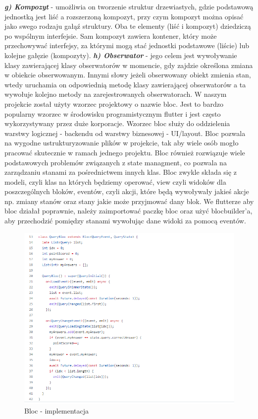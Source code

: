\newline\textbf{\textit{g) Kompozyt}} - umożliwia on tworzenie struktur drzewiastych, gdzie podstawową jednostką jest liść  a rozszerzoną kompozyt, przy czym kompozyt można opisać jako swego rodzaju gałąź struktury. Oba te elementy (liść i kompozyt) dziedziczą po wspólnym interfejsie. Sam kompozyt zawiera kontener, który może przechowywać interfejsy, za którymi mogą stać jednostki podstawowe (liście) lub kolejne gałęzie (kompozyty).
\newline\textbf{\textit{h) Obserwator}} - jego celem jest wywoływanie klasy zawierającej klasy obserwatorów w momencie, gdy zajdzie określona zmiana w obiekcie obserwowanym. Innymi słowy jeżeli obserwowany obiekt zmienia stan, wtedy uruchamia on odpowiednią metodę klasy zawierającej obserwatorów a ta wywołuje kolejno metody na zarejestrowanych obserwatorach.
\newline\newline W naszym projekcie został użyty wzorzec projektowy o nazwie bloc. Jest to bardzo popularny wzorzec w środowisku programistycznym flutter i jest często wykorzystywany przez duże korporacje. Wzorzec bloc służy do oddzielenia warstwy logicznej - backendu od warstwy biznesowej - UI/layout. Bloc pozwala na wygodne ustrukturyzowanie plików w projekcie, tak aby wiele osób mogło pracować skutecznie w ramach jednego projektu. Bloc również rozwiązuje wiele podstawowych problemów związanych z state managment, co pozwala na zarządzaniu stanami za pośrednictwem innych klas. Bloc zwykle składa się z modeli, czyli klas na których będziemy operować, view czyli widoków dla poszczególnych bloków, eventów, czyli akcji, które będą wywoływały jakieś akcje np. zmiany stanów oraz stany jakie może przyjmować dany blok. We flutterze aby bloc działał poprawnie, należy zaimportować paczkę bloc oraz użyć blocbuilder'a, aby przechodzić pomiędzy 
stanami wywołując dane widoki za pomocą eventów.

\begin{figure}[!htb]
	\begin{center}
		\includegraphics[width=15cm]{rys/bloc1.png}
		\caption{Bloc - implementacja}
		\label{rys:rysunek004}
	\end{center}
\end{figure} 
